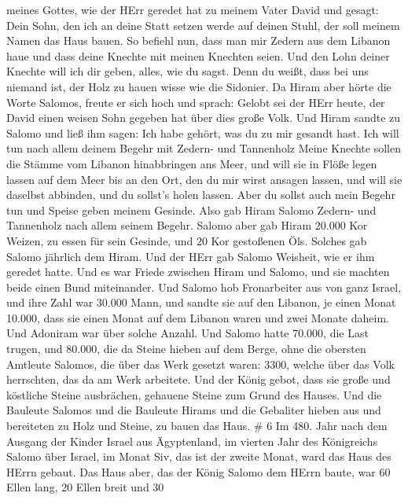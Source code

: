 meines Gottes, wie der HErr geredet hat zu meinem Vater David und
gesagt: Dein Sohn, den ich an deine Statt setzen werde auf deinen Stuhl,
der soll meinem Namen das Haus bauen.  So befiehl nun, dass
man mir Zedern aus dem Libanon haue und dass deine Knechte mit meinen
Knechten seien. Und den Lohn deiner Knechte will ich dir geben, alles,
wie du sagst. Denn du weißt, dass bei uns niemand ist, der Holz zu hauen
wisse wie die Sidonier.  Da Hiram aber hörte die Worte
Salomos, freute er sich hoch und sprach: Gelobt sei der HErr heute, der
David einen weisen Sohn gegeben hat über dies große Volk. 
Und Hiram sandte zu Salomo und ließ ihm sagen: Ich habe gehört, was du
zu mir gesandt hast. Ich will tun nach allem deinem Begehr mit Zedern-
und Tannenholz  Meine Knechte sollen die Stämme vom Libanon
hinabbringen ans Meer, und will sie in Flöße legen lassen auf dem Meer
bis an den Ort, den du mir wirst ansagen lassen, und will sie daselbst
abbinden, und du sollst's holen lassen. Aber du sollst auch mein Begehr
tun und Speise geben meinem Gesinde.  Also gab Hiram Salomo
Zedern- und Tannenholz nach allem seinem Begehr.  Salomo
aber gab Hiram 20.000 Kor Weizen, zu essen für sein Gesinde, und 20 Kor
gestoßenen Öls. Solches gab Salomo jährlich dem Hiram.  Und
der HErr gab Salomo Weisheit, wie er ihm geredet hatte. Und es war
Friede zwischen Hiram und Salomo, und sie machten beide einen Bund
miteinander.  Und Salomo hob Fronarbeiter aus von ganz
Israel, und ihre Zahl war 30.000 Mann,  und sandte sie auf
den Libanon, je einen Monat 10.000, dass sie einen Monat auf dem Libanon
waren und zwei Monate daheim. Und Adoniram war über solche Anzahl.
 Und Salomo hatte 70.000, die Last trugen, und 80.000, die
da Steine hieben auf dem Berge,  ohne die obersten Amtleute
Salomos, die über das Werk gesetzt waren: 3300, welche über das Volk
herrschten, das da am Werk arbeitete.  Und der König gebot,
dass sie große und köstliche Steine ausbrächen, gehauene Steine zum
Grund des Hauses.  Und die Bauleute Salomos und die
Bauleute Hirams und die Gebaliter hieben aus und bereiteten zu Holz und
Steine, zu bauen das Haus. \# 6  Im 480. Jahr nach dem
Ausgang der Kinder Israel aus Ägyptenland, im vierten Jahr des
Königreichs Salomo über Israel, im Monat Siv, das ist der zweite Monat,
ward das Haus des HErrn gebaut.  Das Haus aber, das der
König Salomo dem HErrn baute, war 60 Ellen lang, 20 Ellen breit und 30
